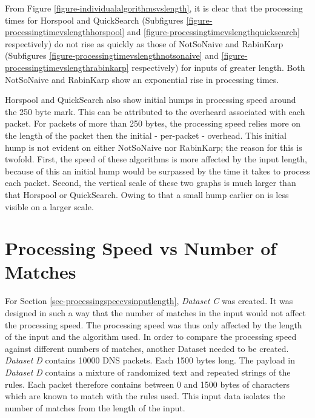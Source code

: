 \documentclass[11pt]{article}
\begin{document}
From Figure \ref{figure-individualalgorithmsvslength}, it is clear that the processing times for Horspool and QuickSearch (Subfigures \ref{figure-processingtimevslengthhorspool} and \ref{figure-processingtimevslengthquicksearch} respectively) do not rise as quickly as those of NotSoNaive and RabinKarp (Subfigures \ref{figure-processingtimevslengthnotsonaive} and \ref{figure-processingtimevslengthrabinkarp} respectively) for inputs of greater length. Both NotSoNaive and RabinKarp show an exponential rise in processing times. 

Horspool and QuickSearch also show initial humps in processing speed around the 250 byte mark. This can be attributed to the overheard associated with each packet. For packets of more than 250 bytes, the processing speed relies more on the length of the packet then the initial - per-packet - overhead. This initial hump is not evident on either NotSoNaive nor RabinKarp; the reason for this is twofold. First, the speed of these algorithms is more affected by the input length, because of this an initial hump would be surpassed by the time it takes to process each packet. Second, the vertical scale of these two graphs is much larger than that Horspool or QuickSearch. Owing to that a small hump earlier on is less visible on a larger scale.


\section{Processing Speed vs Number of Matches}

For Section \ref{sec-processingspeecvsinputlength}, \textit{Dataset C} was created. It was designed in such a way that the number of matches in the input would not affect the processing speed. The processing speed was thus only affected by the length of the input and the algorithm used. In order to compare the processing speed against different numbers of matches, another Dataset needed to be created. \textit{Dataset D} contains 10000 DNS packets. Each 1500 bytes long. The payload in \textit{Dataset D} contains a mixture of randomized text and repeated strings of the rules. Each packet therefore contains between 0 and 1500 bytes of characters which are known to match with the rules used. This input data isolates the number of matches from the length of the input.
\end{document}
